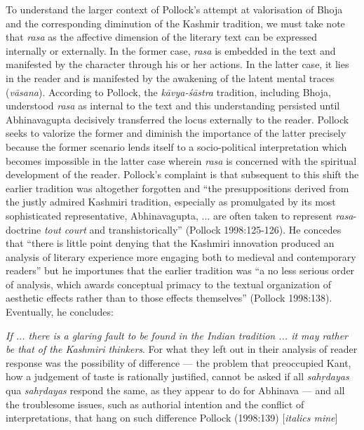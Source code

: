 To understand the larger context of Pollock's attempt at valorisation of Bhoja and the corresponding diminution of the Kashmir tradition, we must take note that {\sl rasa} as the affective dimension of the literary text can be expressed internally or externally. In the former case, {\sl rasa} is embedded in the text and manifested by the character through his or her actions. In the latter case, it lies in the reader and is manifested by the awakening of the latent mental traces ({\sl vāsana}). According to Pollock, the {\sl kāvya-śāstra} tradition, including Bhoja, understood {\sl rasa} as internal to the text and this understanding persisted until Abhinavagupta decisively transferred the locus externally to the reader. Pollock seeks to valorize the former and diminish the importance of the latter precisely because the former scenario lends itself to a socio-political interpretation which becomes impossible in the latter case wherein {\sl rasa} is concerned with the spiritual development of the reader. Pollock's complaint is that subsequent to this shift the earlier tradition was altogether forgotten and ``the presuppositions derived from the justly admired Kashmiri tradition, especially as promulgated by its most sophisticated representative, Abhinavagupta, ... are often taken to represent {\sl rasa}-doctrine {\sl tout court} and transhistorically'' (Pollock 1998:125-126). He concedes that ``there is little point denying that the Kashmiri innovation produced an analysis of literary experience more engaging both to medieval and contemporary readers'' but he importunes that the earlier tradition was ``a no less serious order of analysis, which awards conceptual primacy to the textual organization of aesthetic effects rather than to those effects themselves'' (Pollock 1998:138). Eventually, he concludes:

\smallskip

\begin{myquote}
{{\sl If ... there is a glaring fault to be found in the Indian tradition ... it may rather be that of the Kashmiri thinkers}}. For what they left out in their analysis of reader response was the possibility of difference --- the problem that preoccupied Kant, how a judgement of taste is rationally justified, cannot be asked if all {\sl sahṛdayas} qua {\sl sahṛdayas} respond the same, as they appear to do for Abhinava --- and all the troublesome issues, such as authorial intention and the conflict of interpretations, that hang on such difference 
\hfill Pollock (1998:139) [{\sl italics mine}]
\end{myquote}

